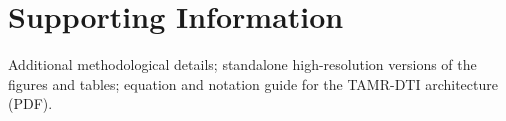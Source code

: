 \section*{\mdseries Supporting Information}
Additional methodological details; standalone high-resolution versions of the
figures and tables; equation and notation guide for the TAMR-DTI architecture
(PDF).
